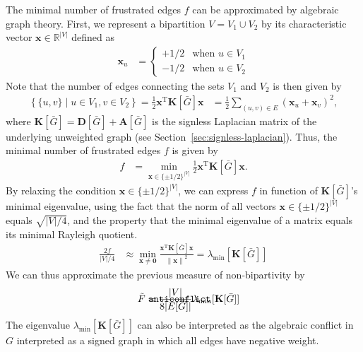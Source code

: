 \documentclass{article}
\def\mathnote#1{%
  \tag*{\rlap{\hspace\marginparsep\smash{\parbox[t]{\marginparwidth}{#1}}}}
}
\begin{document}
The minimal number of frustrated edges $f$ can be approximated by
algebraic graph theory.  First, we represent a bipartition $V = V_1 \cup
V_2$ by its characteristic vector $\mathbf x \in \mathbb R^{|V|}$
defined as
\begin{align*}
  \mathbf x_u &= \left\{ \begin{array}{ll} +1/2 & \text{when $u \in
      V_1$} \\ -1/2 & \text{when $u \in V_2$}
    \end{array} \right. 
\end{align*}
Note that the number of edges connecting the sets $V_1$ and $V_2$ is
then given by
\begin{align*}
\left\{ \{u,v\} \mid u \in V_1, v \in V_2 \right\} = \frac 12 \mathbf
x^{\mathrm T} \mathbf K[\bar G] \mathbf x &= \frac 12 \sum_{(u,v) \in E}
(\mathbf x_u + \mathbf x_v)^2,
\end{align*}
where $\mathbf K[\bar G] = \mathbf D[\bar G] + \mathbf A[\bar G]$ is the
signless Laplacian matrix of the underlying unweighted graph (see
Section~\ref{sec:signless-laplacian}).  Thus, the 
minimal number of frustrated edges $f$ is given by
\begin{align*}
  f &= \min_{\mathbf x \in \{\pm 1/2\}^{|V|}} \frac 12 \mathbf
  x^{\mathrm T} \mathbf K[\bar G] \mathbf x.
\end{align*}
By relaxing the condition $\mathbf x \in \{\pm 1/2\}^{|V|}$, we can
express $f$ in function of $\mathbf K[\bar G]$'s minimal eigenvalue,
using the fact that the norm of all vectors $\mathbf x \in \{\pm
1/2\}^{|V|}$ equals $\sqrt{|V|/4}$, and the property that the minimal
eigenvalue of a matrix equals its minimal Rayleigh quotient.
\begin{align*}
  \frac {2f} {|V|/4} &\approx \min_{\mathbf x \neq \mathbf 0} \frac
        {\mathbf x^{\mathrm T} \mathbf K[\bar G] \mathbf x} {\left\|
          \mathbf x \right\|^2} = \lambda_{\min}[\mathbf K[\bar G]]
\end{align*}
We can thus approximate the previous measure of non-bipartivity by
\begin{align}
  \mathnote{\texttt{anticonflict}} \tilde F &= \frac {|V|} {8 |E[\bar
      G]|} \lambda_{\min}[\mathbf K[\bar G]]
\end{align}
The eigenvalue $\lambda_{\min}[\mathbf K[\bar G]]$ can also be
interpreted as the algebraic conflict in $G$ interpreted as a signed
graph in which all edges have negative weight.
\end{document}
